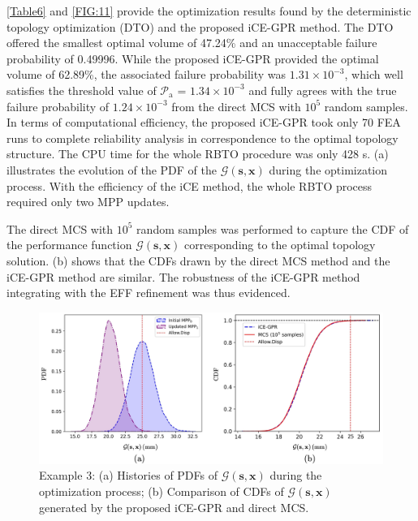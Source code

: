 \documentclass[preprint,3p]{elsarticle}
\begin{document}
\begin{linenumbers}
\cref{Table6} and \cref{FIG:11} provide the optimization results found by the deterministic topology optimization (DTO) and the proposed iCE-GPR method. The DTO offered the smallest optimal volume of 47.24\% and an unacceptable failure probability of 0.49996.
While the proposed iCE-GPR provided the optimal volume of 62.89\%, the associated failure probability was $1.31\times10^{-3}$, which well satisfies the threshold value of $\mathcal{P}_\text{a}$ =  $1.34\times10^{-3}$ and fully agrees with the true failure probability of $1.24\times10^{-3}$ from the direct MCS with $10^5$ random samples. In terms of computational efficiency, the proposed iCE-GPR took only 70 FEA runs to complete reliability analysis in correspondence to the optimal topology structure. The CPU time for the whole RBTO procedure was only 428 s. 
(a) illustrates the evolution of the PDF of the $\mathcal{G}(\textbf{s},\textbf{x})$ during the optimization process. With the efficiency of the iCE method, the whole RBTO process required only two MPP updates. %

The direct MCS with $10^5$ random samples was performed to capture the CDF of the performance function $\mathcal{G}(\textbf{s},\textbf{x})$ corresponding to the optimal topology solution. (b) shows that the CDFs drawn by the direct MCS method and the iCE-GPR method are similar. The robustness of the iCE-GPR method integrating with the EFF refinement was thus evidenced.

\begin{figure}
	\begin{center}
		\includegraphics[scale=1.2]{Fig12.jpg}
	\end{center}
	\caption{Example 3: (a) Histories of PDFs of $\mathcal{G}(\textbf{s},\textbf{x})$ during the optimization process; (b) Comparison of CDFs of $\mathcal{G}(\textbf{s},\textbf{x})$ generated by the proposed iCE-GPR and direct MCS.}
	\label{FIG:12}
\end{figure}


\end{linenumbers}
\end{document}
